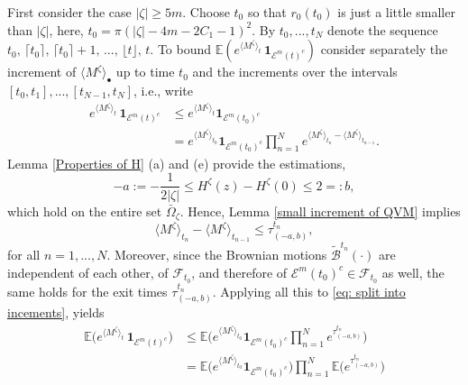 \documentclass[11pt]{article}
\makeatletter
\renewenvironment{proof}[1][\proofname]{
   \par\pushQED{\qed}\normalfont
   \topsep6\p@\@plus6\p@\relax
   \trivlist\item[\hskip\labelsep\bfseries#1\@addpunct{.}]
   \ignorespaces
}{
   \popQED\endtrivlist\@endpefalse
}
\numberwithin{equation}{section}
\def\Ex{\mathbb{E}}
\def\QVT{\langle M^{\zeta} \rangle_t}
\def\QV{\langle M ^{\zeta} \rangle}
\def\mydot{\boldsymbol{\cdot}}
\makeatother
\begin{document}
\begin{proof}[Proof of Lemma \ref{No early point then small QV 2}]
  First consider the case $|\zeta| \geq 5m$.  
  Choose $t_0$ so that $r_0(t_0)$ is just a little smaller than $|\zeta|$,  
  here,  \mbox{$t_0 = \pi (|\zeta| - 4m - 2C_1 - 1)^2$}. 
  By $t_0, ..., t_N$ denote the sequence
  $t_0,\, \lceil t_0 \rceil,\, \lceil t_0 \rceil +1,\,...,\, \lfloor t \rfloor, \, t$. 
  To bound $\Ex ( e^{\QVT} \, \boldsymbol{1}_{\mathcal{E}^m(t)^c})$ 
  consider separately the increment of 
  $\QV_{\bullet}$ up to time $t_0$ and the increments over 
  the intervals $[t_0, t_1], ..., [t_{N-1}, t_N]$, i.e., write
  \begin{equation}\label{eq: split into incements}
    \begin{split}
      e^{\QVT} \, \boldsymbol{1}_{\mathcal{E}^m(t)^c}
      & \leq  e^{\QVT}  \boldsymbol{1}_{\mathcal{E}^m(t_0)^c} \\
      & = e^{\QV_{t_0}}  \boldsymbol{1}_{\mathcal{E}^m(t_0)^c} 
        \prod_{n=1}^N e^{\QV_{t_n} - \QV_{t_{n-1}}}.
    \end{split}
  \end{equation}
  Lemma \ref{Properties of H} (a) and (e) provide the estimations,  
  \begin{equation}\label{eq: rough bound on H}
      -a := - \frac{1}{2|\zeta|} \leq H^{\zeta}(z) - H^{\zeta}(0) \leq 2 =: b,
  \end{equation}  
  which hold on the entire set $\bar{\Omega}_{\zeta}$. 
  Hence, Lemma \ref{small increment of QVM} implies
  $$
    \QV_{t_n} - \QV_{t_{n-1}} \leq \tau^{t_n}_{(-a, b)},
  $$
  for all $n = 1,...,N$. 
  Moreover, since the Brownian motions $\tilde{\mathcal{B}}^{t_n}(\mydot)$ are independent of 
  each other, of $\mathcal{F}_{t_0}$, and therefore of 
  $\mathcal{E}^m(t_0)^c \in \mathcal{F}_{t_0}$ as well, 
  the same holds for the exit times $\tau^{t_n}_{(-a, b)}$. 
  Applying all this to \eqref{eq: split into incements}, yields 
  \begin{equation}\label{eq: since independent}
    \begin{split}
      \Ex \big( e^{\QVT} \, \boldsymbol{1}_{\mathcal{E}^m(t)^c} \big)
      &\leq \Ex \bigg( e^{\QV_{t_0}}  \boldsymbol{1}_{\mathcal{E}^m(t_0)^c}  
        \prod_{n=1}^N  e^ {\tau^{t_n}_{(-a,b)}}  \bigg)\\
      &= \Ex \big( e^{\QV_{t_0}}  \boldsymbol{1}_{\mathcal{E}^m(t_0)^c} \big)
          \prod_{n=1}^N \Ex \big( e^{\tau^{t_n}_{(-a,b)}}  \big) 
    \end{split}
  \end{equation}


\end{proof}
\end{document}
